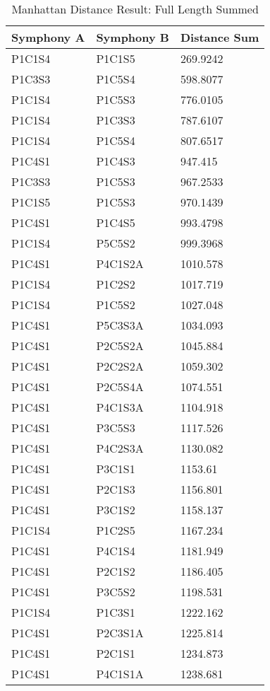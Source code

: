 \begin{longtable}{|l|l|l|}
\caption{Manhattan Distance Result: Full Length Summed}
\label{my-label}\\
\hline
Symphony A & Symphony B & Distance Sum \\ \hline
\endfirsthead
\endhead
%
P1C1S4 & P1C1S5 & 269.9242 \\ \hline
P1C3S3 & P1C5S4 & 598.8077 \\ \hline
P1C1S4 & P1C5S3 & 776.0105 \\ \hline
P1C1S4 & P1C3S3 & 787.6107 \\ \hline
P1C1S4 & P1C5S4 & 807.6517 \\ \hline
P1C4S1 & P1C4S3 & 947.415 \\ \hline
P1C3S3 & P1C5S3 & 967.2533 \\ \hline
P1C1S5 & P1C5S3 & 970.1439 \\ \hline
P1C4S1 & P1C4S5 & 993.4798 \\ \hline
P1C1S4 & P5C5S2 & 999.3968 \\ \hline
P1C4S1 & P4C1S2A & 1010.578 \\ \hline
P1C1S4 & P1C2S2 & 1017.719 \\ \hline
P1C1S4 & P1C5S2 & 1027.048 \\ \hline
P1C4S1 & P5C3S3A & 1034.093 \\ \hline
P1C4S1 & P2C5S2A & 1045.884 \\ \hline
P1C4S1 & P2C2S2A & 1059.302 \\ \hline
P1C4S1 & P2C5S4A & 1074.551 \\ \hline
P1C4S1 & P4C1S3A & 1104.918 \\ \hline
P1C4S1 & P3C5S3 & 1117.526 \\ \hline
P1C4S1 & P4C2S3A & 1130.082 \\ \hline
P1C4S1 & P3C1S1 & 1153.61 \\ \hline
P1C4S1 & P2C1S3 & 1156.801 \\ \hline
P1C4S1 & P3C1S2 & 1158.137 \\ \hline
P1C1S4 & P1C2S5 & 1167.234 \\ \hline
P1C4S1 & P4C1S4 & 1181.949 \\ \hline
P1C4S1 & P2C1S2 & 1186.405 \\ \hline
P1C4S1 & P3C5S2 & 1198.531 \\ \hline
P1C1S4 & P1C3S1 & 1222.162 \\ \hline
P1C4S1 & P2C3S1A & 1225.814 \\ \hline
P1C4S1 & P2C1S1 & 1234.873 \\ \hline
P1C4S1 & P4C1S1A & 1238.681 \\ \hline
\end{longtable}

